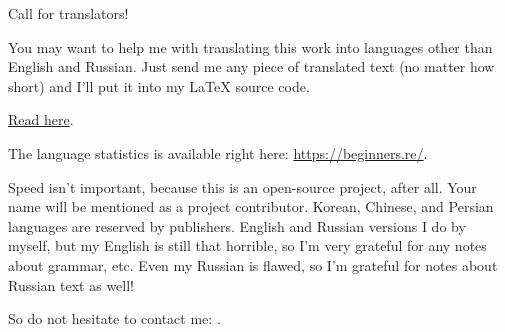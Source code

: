 \vspace*{\fill}

\Huge Call for translators!

\normalsize

\bigskip
\bigskip
\bigskip

You may want to help me with translating this work into languages other than English and Russian.
Just send me any piece of translated text (no matter how short) and I'll put it into my LaTeX source code.

\href{\GitHubBlobMasterURL/Translation.md}{Read here}.

The language statistics is available right here: \url{https://beginners.re/}.

Speed isn't important, because this is an open-source project, after all.
Your name will be mentioned as a project contributor.
Korean, Chinese, and Persian languages are reserved by publishers.
English and Russian versions I do by myself, but my English is still that horrible, so I'm very grateful for any notes about grammar, etc.
Even my Russian is flawed, so I'm grateful for notes about Russian text as well!%

So do not hesitate to contact me: \GTT{\EMAIL}.

\vspace*{\fill}
\vfill
